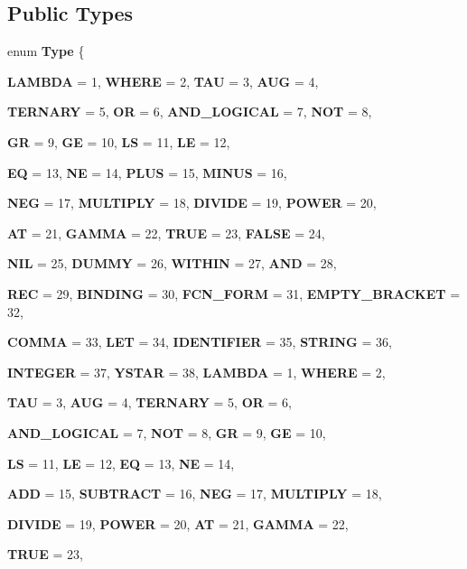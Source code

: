\subsection*{Public Types}
\begin{DoxyCompactItemize}
\item 
enum {\bfseries Type} \{ \par
{\bfseries LAMBDA} =  1, 
{\bfseries WHERE} =  2, 
{\bfseries TAU} =  3, 
{\bfseries AUG} =  4, 
\par
{\bfseries TERNARY} =  5, 
{\bfseries OR} =  6, 
{\bfseries AND\_\-LOGICAL} =  7, 
{\bfseries NOT} =  8, 
\par
{\bfseries GR} =  9, 
{\bfseries GE} =  10, 
{\bfseries LS} =  11, 
{\bfseries LE} =  12, 
\par
{\bfseries EQ} =  13, 
{\bfseries NE} =  14, 
{\bfseries PLUS} =  15, 
{\bfseries MINUS} =  16, 
\par
{\bfseries NEG} =  17, 
{\bfseries MULTIPLY} =  18, 
{\bfseries DIVIDE} =  19, 
{\bfseries POWER} =  20, 
\par
{\bfseries AT} =  21, 
{\bfseries GAMMA} =  22, 
{\bfseries TRUE} =  23, 
{\bfseries FALSE} =  24, 
\par
{\bfseries NIL} =  25, 
{\bfseries DUMMY} =  26, 
{\bfseries WITHIN} =  27, 
{\bfseries AND} =  28, 
\par
{\bfseries REC} =  29, 
{\bfseries BINDING} =  30, 
{\bfseries FCN\_\-FORM} =  31, 
{\bfseries EMPTY\_\-BRACKET} =  32, 
\par
{\bfseries COMMA} =  33, 
{\bfseries LET} =  34, 
{\bfseries IDENTIFIER} =  35, 
{\bfseries STRING} =  36, 
\par
{\bfseries INTEGER} =  37, 
{\bfseries YSTAR} =  38, 
{\bfseries LAMBDA} =  1, 
{\bfseries WHERE} =  2, 
\par
{\bfseries TAU} =  3, 
{\bfseries AUG} =  4, 
{\bfseries TERNARY} =  5, 
{\bfseries OR} =  6, 
\par
{\bfseries AND\_\-LOGICAL} =  7, 
{\bfseries NOT} =  8, 
{\bfseries GR} =  9, 
{\bfseries GE} =  10, 
\par
{\bfseries LS} =  11, 
{\bfseries LE} =  12, 
{\bfseries EQ} =  13, 
{\bfseries NE} =  14, 
\par
{\bfseries ADD} =  15, 
{\bfseries SUBTRACT} =  16, 
{\bfseries NEG} =  17, 
{\bfseries MULTIPLY} =  18, 
\par
{\bfseries DIVIDE} =  19, 
{\bfseries POWER} =  20, 
{\bfseries AT} =  21, 
{\bfseries GAMMA} =  22, 
\par
{\bfseries TRUE} =  23, 

\end{DoxyCompactItemize}
